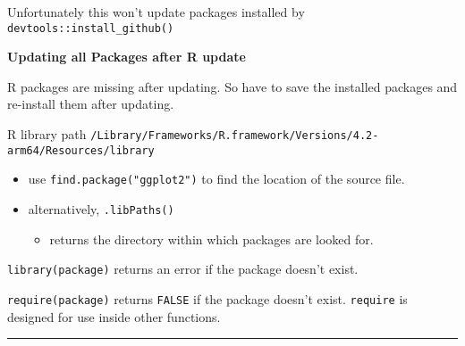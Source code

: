 \documentclass[
]{book}
\newenvironment{Shaded}{\begin{snugshade}}{\end{snugshade}}
\newcommand{\AttributeTok}[1]{\textcolor[rgb]{0.13,0.29,0.53}{#1}}
\newcommand{\CommentTok}[1]{\textcolor[rgb]{0.56,0.35,0.01}{\textit{#1}}}
\newcommand{\ConstantTok}[1]{\textcolor[rgb]{0.56,0.35,0.01}{#1}}
\newcommand{\DecValTok}[1]{\textcolor[rgb]{0.00,0.00,0.81}{#1}}
\newcommand{\DocumentationTok}[1]{\textcolor[rgb]{0.56,0.35,0.01}{\textbf{\textit{#1}}}}
\newcommand{\FunctionTok}[1]{\textcolor[rgb]{0.13,0.29,0.53}{\textbf{#1}}}
\newcommand{\NormalTok}[1]{#1}
\newcommand{\OtherTok}[1]{\textcolor[rgb]{0.56,0.35,0.01}{#1}}
\newcommand{\SpecialCharTok}[1]{\textcolor[rgb]{0.81,0.36,0.00}{\textbf{#1}}}
\newcommand{\StringTok}[1]{\textcolor[rgb]{0.31,0.60,0.02}{#1}}
\providecommand{\tightlist}{%
  \setlength{\itemsep}{0pt}\setlength{\parskip}{0pt}}
\begin{document}
Unfortunately this {won't} update packages installed by \texttt{devtools::install\_github()}

\textbf{Updating all Packages after {R update}}

R packages are missing after updating. So have to save the installed packages and re-install them after updating.

\begin{Shaded}
\end{Shaded}

R library path \texttt{/Library/Frameworks/R.framework/Versions/4.2-arm64/Resources/library}

\begin{itemize}
\tightlist
\item
  use \texttt{find.package("ggplot2")} to find the location of the source file.
\item
  alternatively, \texttt{.libPaths()}

  \begin{itemize}
  \tightlist
  \item
    returns the directory within which packages are looked for.
  \end{itemize}
\end{itemize}

\texttt{library(package)} returns an error if the package doesn't exist.

\texttt{require(package)} returns \texttt{FALSE} if the package doesn't exist. \texttt{require} is designed for use inside other functions.

\begin{center}\rule{0.5\linewidth}{0.5pt}\end{center}
\end{document}
